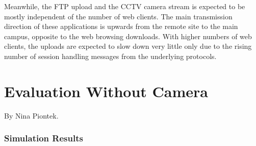 \documentclass[a4paper,10pt]{book}\usepackage{graphicx}
\begin{document}
Meanwhile, the FTP upload and the CCTV camera stream is expected to be mostly independent of the number of web clients. The main transmission direction of these applications is upwards from the remote site to the main campus, opposite to the web browsing downloads. With higher numbers of web clients, the uploads are expected to slow down very little only due to the rising number of session handling messages from the underlying protocols.

\chapter{Evaluation Without Camera}
By Nina Piontek.\\

\subsection{Simulation Results}
\end{document}
